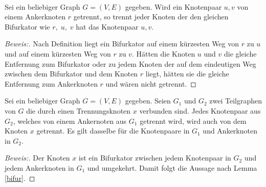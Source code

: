 ~ \linebreak
\vspace{-12mm}
\begin{lem}
\label{bifur}
Sei ein beliebiger Graph $G=(V,E)$ gegeben. Wird ein Knotenpaar $u,v$ von einem Ankerknoten $r$ getrennt, so trennt jeder Knoten der den gleichen Bifurkator wie $r,\;u,\;v$ hat das Knotenpaar $u,v$.
\end{lem}
\begin{proof}[Beweis:]
Nach Definition liegt ein Bifurkator auf einem kürzesten Weg von $r$ zu $u$ und auf einem kürzesten Weg von $r$ zu $v$. Hätten die Knoten $u$ und $v$ die gleiche Entfernung zum Bifurkator oder zu jedem Knoten der auf dem eindeutigen Weg zwischen dem Bifurkator und dem Knoten $r$ liegt, hätten sie die gleiche Entfernung zum Ankerknoten $r$ und wären nicht getrennt.
\end{proof}
\begin{lem}
\label{trennungsknoten}
Sei ein beliebiger Graph $G=(V,E)$ gegeben. Seien $G_1$ und $G_2$ zwei Teilgraphen von $G$ die durch einen Trennungsknoten $x$ verbunden sind. Jedes Knotenpaar aus $G_2$, welches von einem Ankernoten aus $G_1$ getrennt wird, wird auch von dem Knoten $x$ getrennt. Es gilt dasselbe für die Knotenpaare in $G_1$ und Ankerknoten in $G_2$.
\end{lem}
\begin{proof}[Beweis:]
Der Knoten $x$ ist ein Bifurkator zwischen jedem Knotenpaar in $G_2$ und jedem Ankerknoten in $G_1$ und umgekehrt. Damit folgt die Aussage nach Lemma \ref{bifur}.
\end{proof}
